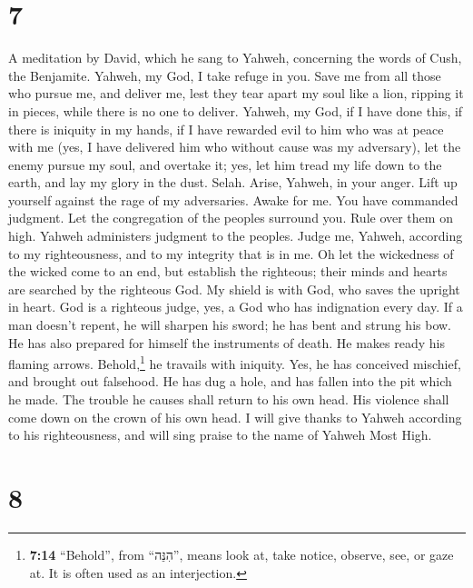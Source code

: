 \hypertarget{section-6}{%
\section{7}\label{section-6}}

A meditation by David, which he sang to Yahweh, concerning the words of
Cush, the Benjamite.  Yahweh, my God, I take refuge in
you. Save me from all those who pursue me, and deliver me,
 lest they tear apart my soul like a lion, ripping it in
pieces, while there is no one to deliver.  Yahweh, my God,
if I have done this, if there is iniquity in my hands,  if
I have rewarded evil to him who was at peace with me (yes, I have
delivered him who without cause was my adversary),  let
the enemy pursue my soul, and overtake it; yes, let him tread my life
down to the earth, and lay my glory in the dust. Selah. 
Arise, Yahweh, in your anger. Lift up yourself against the rage of my
adversaries. Awake for me. You have commanded judgment. 
Let the congregation of the peoples surround you. Rule over them on
high.  Yahweh administers judgment to the peoples. Judge
me, Yahweh, according to my righteousness, and to my integrity that is
in me.  Oh let the wickedness of the wicked come to an
end, but establish the righteous; their minds and hearts are searched by
the righteous God.  My shield is with God, who saves the
upright in heart.  God is a righteous judge, yes, a God
who has indignation every day.  If a man doesn't repent,
he will sharpen his sword; he has bent and strung his bow.
 He has also prepared for himself the instruments of
death. He makes ready his flaming arrows. 
Behold,\footnote{\textbf{7:14} ``Behold'', from ``הִנֵּה'', means look
  at, take notice, observe, see, or gaze at. It is often used as an
  interjection.} he travails with iniquity. Yes, he has conceived
mischief, and brought out falsehood.  He has dug a hole,
and has fallen into the pit which he made.  The trouble
he causes shall return to his own head. His violence shall come down on
the crown of his own head.  I will give thanks to Yahweh
according to his righteousness, and will sing praise to the name of
Yahweh Most High.

\hypertarget{section-7}{%
\section{8}\label{section-7}}

